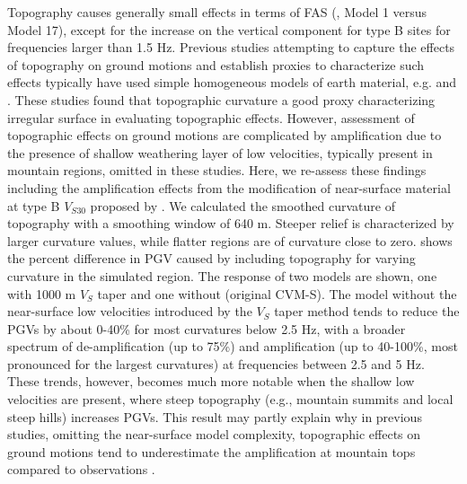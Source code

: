 Topography causes generally small effects in terms of FAS (, Model 1 versus Model 17), except for the increase on the vertical component for type B sites for frequencies larger than 1.5 Hz. %
Previous studies attempting to capture the effects of topography on ground motions and establish proxies to characterize such effects typically have used simple homogeneous models of earth material, e.g. \citet{maufroyFrequencyScaledCurvature2015} and \citet{raiEmpiricalTerrainBasedTopographic2017}.  These studies found that topographic curvature a good proxy characterizing irregular surface in evaluating topographic effects. However, assessment of topographic effects on ground motions are complicated by amplification due to the presence of shallow weathering layer of low velocities, typically present in mountain regions, omitted in these studies. Here, we re-assess these findings including the amplification effects from the modification of near-surface material at type B $V_{S30}$ proposed by \citet{huCalibrationNearsurfaceSeismic2021}. We calculated the smoothed curvature of topography with a smoothing window of 640 m.
Steeper relief is characterized by larger curvature values, while flatter regions are of curvature close to zero.  shows the percent difference in PGV caused by including topography for varying curvature in the simulated region. The response of two models are shown, one with 1000 m $V_S$ taper \citep{huCalibrationNearsurfaceSeismic2021} and one without (original CVM-S). The model without the near-surface low velocities introduced by the $V_S$ taper method tends to reduce the PGVs by about 0-40\% for most curvatures below 2.5 Hz, with a broader spectrum of de-amplification (up to 75\%) and amplification (up to 40-100\%, most pronounced for the largest curvatures) at frequencies between 2.5 and 5 Hz. These trends, however, becomes much more notable when the shallow low velocities are present, where steep topography (e.g., mountain summits and local steep hills) increases PGVs. This result may partly explain why in previous studies, omitting the near-surface model complexity, topographic effects on ground motions tend to underestimate the amplification at mountain tops compared to observations .


